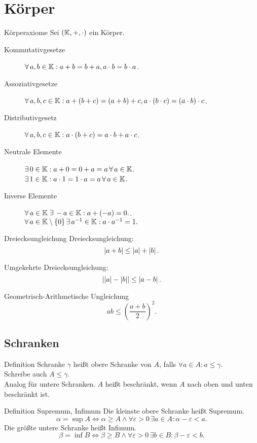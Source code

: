 \documentclass[main.tex]{subfiles}
\begin{document}
\section*{Körper}
\begin{karte}{Körperaxiome}
    Sei \( (\mathbb{K}, +, \cdot ) \) ein Körper.
    \begin{description}
        \item[Kommutativgesetze] \( \forall a,b\in \K: a + b = b + a, a \cdot b = b \cdot a \).
        \item[Assoziativgesetze] \( \forall a,b,c \in \K: 
        a + (b + c) = (a + b) + c, a \cdot (b \cdot c) = (a \cdot b) \cdot c \).
        \item[Distributivgesetz] \( \forall a,b,c\in \K: 
        a \cdot (b + c) = a \cdot b + a \cdot c \).
        \item[Neutrale Elemente] 
        \( \exists 0 \in \K: a + 0 = 0 + a = a \,\forall a \in \K \).\\
        \( \exists 1 \in \K: a \cdot 1 = 1 \cdot a = a \,\forall a \in \K \).
        \item[Inverse Elemente] 
        \( \forall a \in \K \;\exists -a \in \K: a + (-a) = 0. \).\\
        \( \forall a \in \K \setminus \set{0} \, \exists a^{-1} \in \K: a \cdot a^{-1} = 1. \)
    \end{description}
\end{karte}
\begin{karte}{Dreiecksungleichung}
   Dreiecksungleichung: 
   \[ \left| a + b \right| \leq \left| a \right| + \left| b \right|. \]

   Umgekehrte Dreiecksungleichung: 
   \[ \left|  \left| a \right| - \left| b \right|  \right| \leq \left|  a - b  \right|. \]
\end{karte}
\begin{karte}{Geometrisch-Arithmetische Ungleichung}
    \[ ab \leq {\left( \frac{a + b}{2} \right)}^2. \]
\end{karte}
\subsection*{Schranken}
\begin{karte}{Definition Schranke}
    \( \gamma \) heißt 
    obere Schranke von \(A\), falls \( \forall a \in A : a \leq \gamma \).\\
    Schreibe auch \( A \leq \gamma \).\\
    Analog für untere Schranken.
    \( A \) heißt beschränkt, wenn \(A\) nach oben und unten beschränkt ist.
\end{karte}
\begin{karte}{Definition Supremum, Infimum}
    Die kleinste obere Schranke heißt Supremum.
    \[ \alpha = \sup A \Leftrightarrow \alpha \geq A \wedge 
    \forall \varepsilon > 0 \,\exists a \in A: \alpha - \varepsilon < a. \]
    Die größte untere Schranke heißt Infimum.
    \[ \beta = \inf B \Leftrightarrow \beta \geq B \wedge 
    \forall \varepsilon > 0 \,\exists b \in B: \beta - \varepsilon < b. \]
\end{karte}
\end{document}
